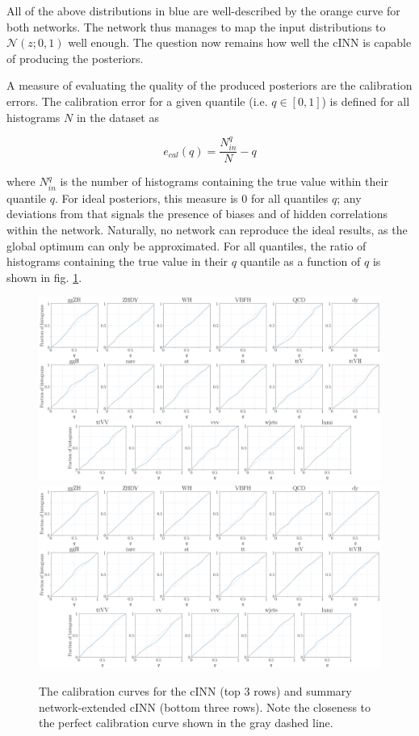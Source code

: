 All of the above distributions in blue are well-described by the orange curve for both networks. The network thus manages to map the input distributions to $\mathcal{N}(z; 0,1)$ well enough. The question now remains how well the cINN is capable of producing the posteriors.


A measure of evaluating the quality of the produced posteriors are the calibration errors. The calibration error for a given quantile (i.e. $q\in [0, 1]$) is defined for all histograms $N$ in the dataset as

\begin{equation*}
	e_{cal}(q) = \frac{N^q_{in}}{N} - q
\end{equation*}

where $N^q_{in}$ is the number of histograms containing the true value within their quantile $q$. For ideal posteriors, this measure is 0 for all quantiles $q$; any deviations from that signals the presence of biases and of hidden correlations within the network. Naturally, no network can reproduce the ideal results, as the global optimum can only be approximated. For all quantiles, the ratio of histograms containing the true value in their $q$ quantile as a function of $q$ is shown in fig. \ref{fig:ecals}.

\begin{figure}[h!]
	\centering
	\includegraphics[width=\linewidth]{figures/inference/ecal}
	\includegraphics[width=\linewidth]{figures/inference/ecal_SN}
	\caption{The calibration curves for the cINN (top 3 rows) and summary network-extended cINN (bottom three rows). Note the closeness to the perfect calibration curve shown in the gray dashed line.}
	\label{fig:ecals}
\end{figure}

